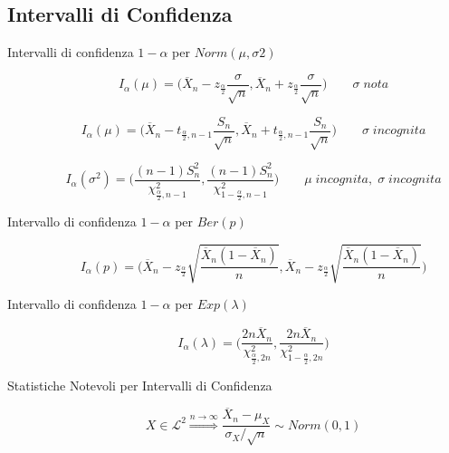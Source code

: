 \newpage

\subsection{Intervalli di Confidenza}

\begin{description}
	
	\item[Intervalli di confidenza $1-\alpha$ per $Norm(\mu,\sigma{2})$]
	\begin{equation}
	I_{\alpha}(\mu)= \Big(\overline{X}_{n}-z_{\frac{\alpha}{2}}\frac{\sigma}{\sqrt{n}},\overline{X}_{n}+z_{\frac{\alpha}{2}}\frac{\sigma}{\sqrt{n}}\Big)
	\qquad
	\sigma\;nota
	\end{equation}
	
	\begin{equation}
	I_{\alpha}(\mu)= \Big(\overline{X}_{n}-t_{\frac{\alpha}{2},n-1}\frac{S_{n}}{\sqrt{n}},\overline{X}_{n}+t_{\frac{\alpha}{2},n-1}\frac{S_{n}}{\sqrt{n}}\Big)
	\qquad
	\sigma\;incognita
	\end{equation}
	
	\begin{equation}
	I_{\alpha}(\sigma^{2})= \Big(\frac{(n-1)S_{n}^{2}}{\chi_{\frac{\alpha}{2},n-1}^{2}},
	\frac{(n-1)S_{n}^{2}}{\chi_{1-\frac{\alpha}{2},n-1}^{2}}\Big)
	\qquad
	\mu\;incognita,\;
	\sigma\;incognita
	\end{equation}
	
	\item[Intervallo di confidenza $1-\alpha$ per $Ber(p)$]
	\begin{equation}
	I_{\alpha}(p)=
	\Big(\overline{X}_{n}-z_{\frac{\alpha}{2}}\sqrt{\frac{\overline{X}_{n}(1-\overline{X}_{n})}{n}},\overline{X}_{n}-z_{\frac{\alpha}{2}}\sqrt{\frac{\overline{X}_{n}(1-\overline{X}_{n})}{n}}\Big)
	\end{equation}
	
	\item[Intervallo di confidenza $1-\alpha$ per $Exp(\lambda)$]
	\begin{equation}
	I_{\alpha}(\lambda)=
	\Big(\frac{2n\overline{X}_{n}}{\chi_{\frac{\alpha}{2},2n}^{2}},\frac{2n\overline{X}_{n}}{\chi_{1-\frac{\alpha}{2},2n}^{2}}\Big)
	\end{equation}
	
	\item[Statistiche Notevoli per Intervalli di Confidenza]
	\begin{equation}
	X\in\mathcal{L}^{2}
	\overset{n\rightarrow\infty}{\Rightarrow}
	\frac{\overline{X}_{n}-\mu_{X}}{\sigma_{X}/\sqrt{n}} \sim Norm(0,1)
	\end{equation}
	

\end{description}
